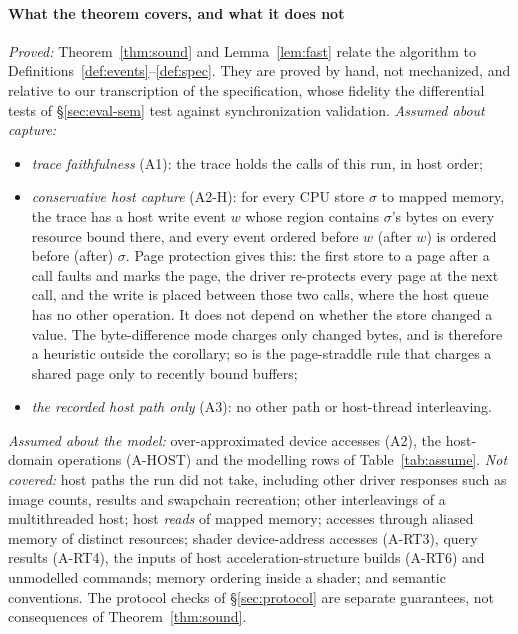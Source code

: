\paragraph{What the theorem covers, and what it does not}
\label{sec:cover}
\emph{Proved:} Theorem~\ref{thm:sound} and Lemma~\ref{lem:fast} relate the algorithm to
Definitions~\ref{def:events}--\ref{def:spec}. They are proved by hand, not mechanized, and relative to our
transcription of the specification, whose fidelity the differential tests of \S\ref{sec:eval-sem} test against
synchronization validation. \emph{Assumed about capture:}
\begin{itemize}
\item \emph{trace faithfulness} (A1): the trace holds the calls of this run, in host order;
\item \emph{conservative host capture} (A2-H): for every CPU store $\sigma$ to mapped memory, the trace has a host
  write event $w$ whose region contains $\sigma$'s bytes on every resource bound there, and every event ordered
  before $w$ (after $w$) is ordered before (after) $\sigma$. Page protection gives this: the first store to a page
  after a call faults and marks the page, the driver re-protects every page at the next call, and the write is
  placed between those two calls, where the host queue has no other operation. It does not depend on whether the
  store changed a value. The byte-difference mode charges only changed bytes, and is therefore a heuristic outside
  the corollary; so is the page-straddle rule that charges a shared page only to recently bound buffers;
\item \emph{the recorded host path only} (A3): no other path or host-thread interleaving.
\end{itemize}
\emph{Assumed about the model:} over-approximated device accesses (A2), the host-domain operations (A-HOST) and the
modelling rows of Table~\ref{tab:assume}. \emph{Not covered:} host paths the run did not take, including other
driver responses such as image counts,  results and swapchain recreation; other
interleavings of a multithreaded host; host \emph{reads} of mapped memory; accesses through aliased memory of distinct
resources; shader device-address accesses (A-RT3), query results (A-RT4), the inputs of host acceleration-structure
builds (A-RT6) and unmodelled commands; memory ordering inside a shader; and semantic conventions. The protocol checks
of \S\ref{sec:protocol} are separate guarantees, not consequences of Theorem~\ref{thm:sound}.

